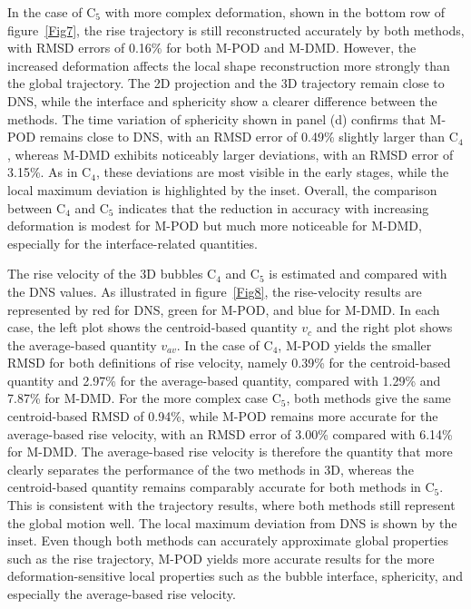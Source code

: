 \documentclass[a4paper,fleqn]{cas-sc}
\begin{document}
	In the case of C$_5$ with more complex deformation, shown in the bottom row of figure~\ref{Fig7}, the rise trajectory is still reconstructed accurately by both methods, with RMSD errors of 0.16\% for both M-POD and M-DMD. However, the increased deformation affects the local shape reconstruction more strongly than the global trajectory. The 2D projection and the 3D trajectory remain close to DNS, while the interface and sphericity show a clearer difference between the methods. The time variation of sphericity shown in panel (d) confirms that M-POD remains close to DNS, with an RMSD error of 0.49\% slightly larger than C$_4$, whereas M-DMD exhibits noticeably larger deviations, with an RMSD error of 3.15\%. As in C$_4$, these deviations are most visible in the early stages, while the local maximum deviation is highlighted by the inset. Overall, the comparison between C$_4$ and C$_5$ indicates that the reduction in accuracy with increasing deformation is modest for M-POD but much more noticeable for M-DMD, especially for the interface-related quantities.
	
	The rise velocity of the 3D bubbles C$_4$ and C$_5$ is estimated and compared with the DNS values. As illustrated in figure~\ref{Fig8}, the rise-velocity results are represented by red for DNS, green for M-POD, and blue for M-DMD. In each case, the left plot shows the centroid-based quantity $v_c$ and the right plot shows the average-based quantity $v_{av}$. In the case of C$_4$, M-POD yields the smaller RMSD for both definitions of rise velocity, namely 0.39\% for the centroid-based quantity and 2.97\% for the average-based quantity, compared with 1.29\% and 7.87\% for M-DMD. For the more complex case C$_5$, both methods give the same centroid-based RMSD of 0.94\%, while M-POD remains more accurate for the average-based rise velocity, with an RMSD error of 3.00\% compared with 6.14\% for M-DMD. The average-based rise velocity is therefore the quantity that more clearly separates the performance of the two methods in 3D, whereas the centroid-based quantity remains comparably accurate for both methods in C$_5$. This is consistent with the trajectory results, where both methods still represent the global motion well. The local maximum deviation from DNS is shown by the inset. Even though both methods can accurately approximate global properties such as the rise trajectory, M-POD yields more accurate results for the more deformation-sensitive local properties such as the bubble interface, sphericity, and especially the average-based rise velocity.
	
\end{document}
